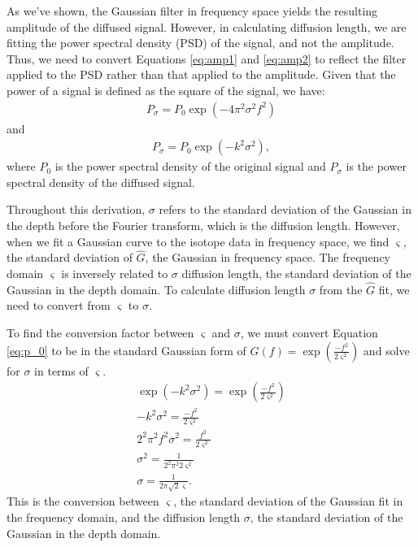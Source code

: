 \documentclass[draft, jgrga]{AGUTeX}
\begin{document}
\begin{article}
As we've shown, the Gaussian filter in frequency space yields the resulting amplitude of the diffused signal. However, in calculating diffusion length, we are fitting the power spectral density (PSD) of the signal, and not the amplitude. Thus, we need to convert Equations \ref{eq:amp1} and \ref{eq:amp2} to reflect the filter applied to the PSD rather than that applied to the amplitude. Given that the power of a signal is defined as the square of the signal, we have:
\begin{eqnarray}
  P_\sigma = P_0 \exp \left(-4\pi^2\sigma^2f^2\right)
\end{eqnarray}
and
\begin{eqnarray}
  \label{eq:p_0}
  P_\sigma = P_0 \exp \left(-k^2 \sigma^2\right),
\end{eqnarray}
where $P_0$ is the power spectral density of the original signal and $P_\sigma$ is the power spectral density of the diffused signal.

Throughout this derivation, $\sigma$ refers to the standard deviation of the Gaussian in the depth before the Fourier transform, which is the diffusion length. However, when we fit a Gaussian curve to the isotope data in frequency space, we find $\varsigma$, the standard deviation of $\hat{G}$, the Gaussian in frequency space. The frequency domain $\varsigma$ is inversely related to $\sigma$ diffusion length, the standard deviation of the Gaussian in the depth domain. To calculate diffusion length $\sigma$ from the $\hat{G}$ fit, we need to convert from $\varsigma$ to $\sigma$.

To find the conversion factor between $\varsigma$ and $\sigma$, we must convert Equation \ref{eq:p_0} to be in the standard Gaussian form of $G(f) = \exp\left(\frac{-f^{2}}{2\varsigma^{2}}\right)$ and solve for $\sigma$ in terms of $\varsigma$.
\begin{eqnarray}
  \exp\left(-k^{2}\sigma^{2}\right) = \exp\left(\frac{-f^{2}}{2\varsigma^{2}}\right)\\
  -k^{2}\sigma^{2} = \frac{-f^{2}}{2\varsigma^{2}}\\
  2^{2}\pi^{2}f^{2}\sigma^{2} = \frac{f^{2}}{2\varsigma^{2}} \\
  \sigma^{2} = \frac{1}{2^{2}\pi^{2}2\varsigma^{2}} \\
  \sigma = \frac{1}{2\pi\sqrt{2}\varsigma}.
\end{eqnarray}
This is the conversion between $\varsigma$, the standard deviation of the Gaussian fit in the frequency domain, and the diffusion length $\sigma$, the standard deviation of the Gaussian in the depth domain.


\end{article}
\end{document}
